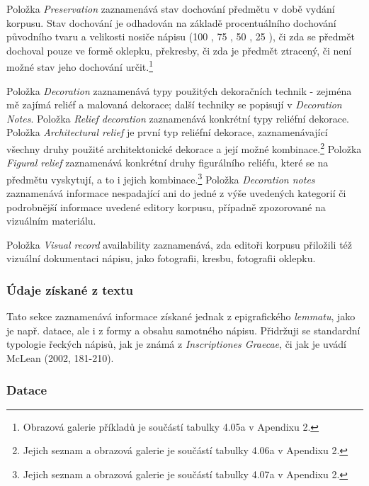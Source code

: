 \startitemize
\item
  \startblockquote
  Položka {\em Preservation} zaznamenává stav dochování předmětu v době vydání korpusu. Stav dochování je odhadován na základě procentuálního dochování původního tvaru a velikosti nosiče nápisu (100 , 75 , 50 , 25 ), či zda se předmět dochoval pouze ve formě oklepku, překresby, či zda je předmět ztracený, či není možné stav jeho dochování určit.\footnote{Obrazová galerie příkladů je součástí tabulky 4.05a v Apendixu 2.}
  \stopblockquote
\item
  \startblockquote
  Položka {\em Decoration} zaznamenává typy použitých dekoračních technik - zejména mě zajímá reliéf a malovaná dekorace; další techniky se popisují v {\em Decoration Notes}. Položka {\em Relief decoration} zaznamenává konkrétní typy reliéfní dekorace. Položka {\em Architectural relief} je první typ reliéfní dekorace, zaznamenávající všechny druhy použité architektonické dekorace a její možné kombinace.\footnote{Jejich seznam a obrazová galerie je součástí tabulky 4.06a v Apendixu 2.} Položka {\em Figural relief} zaznamenává konkrétní druhy figurálního reliéfu, které se na předmětu vyskytují, a to i jejich kombinace.\footnote{Jejich seznam a obrazová galerie je součástí tabulky 4.07a v Apendixu 2.} Položka {\em Decoration notes} zaznamenává informace nespadající ani do jedné z výše uvedených kategorií či podrobnější informace uvedené editory korpusu, případně zpozorované na vizuálním materiálu.
  \stopblockquote
\item
  \startblockquote
  Položka {\em Visual record} availability zaznamenává, zda editoři korpusu přiložili též vizuální dokumentaci nápisu, jako fotografii, kresbu, fotografii oklepku.
  \stopblockquote
\stopitemize

\subsubsection[údaje-získané-z-textu]{Údaje získané z textu}

Tato sekce zaznamenává informace získané jednak z epigrafického {\em lemmatu}, jako je např. datace, ale i z formy a obsahu samotného nápisu. Přidržuji se standardní typologie řeckých nápisů, jak je známá z {\em Inscriptiones Graecae}, či jak je uvádí McLean (2002, 181-210).

\subsubsection[datace]{Datace}

